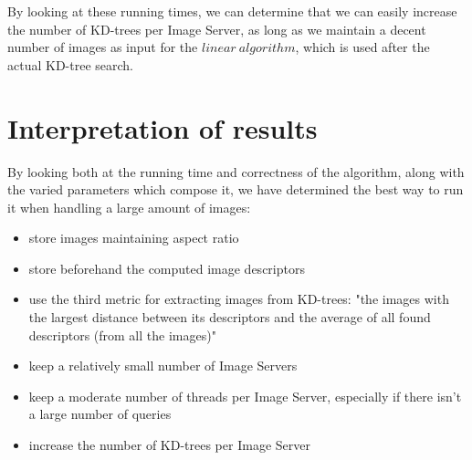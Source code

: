 By looking at these running times, we can determine that we can easily increase the number of KD-trees per Image Server, as long as we maintain a decent number of images as input for the $linear\ algorithm$, which is used after the actual KD-tree search.\\

\section{Interpretation of results}

By looking both at the running time and correctness of the algorithm, along with the varied parameters which compose it, we have determined the best way to run it when handling a large amount of images:
\begin{itemize}
	\item store images maintaining aspect ratio
	\item store beforehand the computed image descriptors
	\item use the third metric for extracting images from KD-trees: "the images with the largest distance between its descriptors and the average of all found descriptors (from all the images)"
	\item keep a relatively small number of Image Servers
	\item keep a moderate number of threads per Image Server, especially if there isn't a large number of queries
	\item increase the number of KD-trees per Image Server
\end{itemize}
